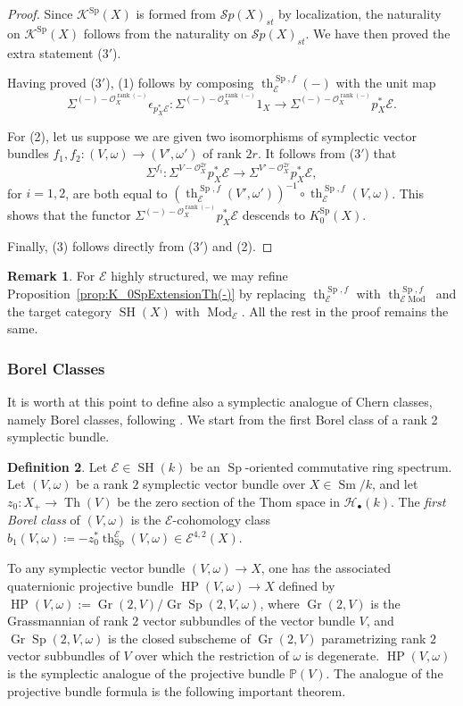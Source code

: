 \documentclass[10pt]{amsart}
\theoremstyle{definition}
\newtheorem{defn}{Definition}[section]
\newtheorem{rmk}[defn]{Remark}
\theoremstyle{plain}
\numberwithin{equation}{section}
\newcommand{\0}{\emptyset}
\newcommand{\sE}{{\mathcal E}}
\newcommand{\sH}{{\mathcal H}}
\newcommand{\sK}{{\mathcal K}}
\newcommand{\sO}{{\mathcal O}}
\newcommand{\sS}{{\mathcal S}}
\renewcommand{\P}{{\mathbb P}}
\newcommand{\Sp}{{\operatorname{Sp}}}
\newcommand{\Gr}{{\operatorname{Gr}}}
\newcommand{\HP}{{\operatorname{HP}}}
\newcommand{\SH}{{\operatorname{SH}}}
\newcommand{\Th}{{\operatorname{Th}}}
\newcommand{\Sm}{{\operatorname{Sm}}}
\renewcommand{\th}{{\operatorname{th}}}
\newcommand{\Mod}{{\operatorname{Mod}}}
\newcommand{\rnk}{{\operatorname{rank}}}
\begin{document}
\begin{proof}
Since $\sK^\Sp(X)$ is formed from $\sS{p}(X)_{st}$ by localization, the naturality on 
$\sK^\Sp(X)$ follows from the naturality on $\sS{p}(X)_{st}$. We have then proved the extra statement ($3'$).

Having proved (3${}'$), (1) follows by composing $\th^{\Sp,f}_{\sE}(-)$ with the unit map 
\[
\Sigma^{(-)-\sO_X^{\rnk(-)}}\epsilon_{p_X^*\sE}:\Sigma^{(-)-\sO_X^{\rnk(-)}}1_X\to \Sigma^{(-)-\sO_X^{\rnk(-)}}p^*_X\sE. 
\]

For (2), let us suppose we are given two isomorphisms of symplectic vector bundles $f_1, f_2:(V,\omega)\to (V', \omega')$ of rank $2r$. It follows from (3${}'$) that
$$\Sigma^{f_i}:\Sigma^{V-\sO_X^{2r}}p_X^*\sE\to \Sigma^{V'-\sO_X^{2r}}p_X^*\sE,$$
for $i=1,2$, are both equal to $(\th^{\Sp,f}_{\sE}(V',\omega'))^{-1}\circ \th^{\Sp,f}_{\sE}(V,\omega)$. This shows that the functor  $\Sigma^{(-)-\sO_X^{\rnk(-)}}p^*_X\sE$ descends to $K_0^\Sp(X)$. 

Finally, (3) follows directly from (3${}'$) and (2).
 \end{proof}

\begin{rmk} For $\sE$ highly structured, we may refine Proposition~\ref{prop:K_0SpExtensionTh(-)} by replacing $\th^{\Sp,f}_{\sE}$ with $\th^{\Sp, f}_{\sE\Mod}$ and the target category $\SH(X)$ with $\Mod_\sE$. All the rest in the proof remains the same.
\end{rmk}
 
\subsubsection{Borel Classes}

It is worth at this point to define also a symplectic analogue of Chern classes, namely Borel classes, following \cite{panwal:grass}. We start from the first Borel class of a rank 2 symplectic bundle.

\begin{defn}
\label{defn:FirstBorelClass}
    Let $\sE \in \SH(k)$ be an $\Sp$-oriented commutative ring spectrum. Let $(V,\omega)$ be a rank $2$ symplectic vector bundle over $X \in \Sm/k$, and let $z_0: X_+ \to \Th(V)$ be the zero section of the Thom space in $\sH_\bullet(k)$. The \emph{first Borel class} of $(V,\omega)$ is the $\sE$-cohomology class $b_1(V,\omega) \coloneqq -z_0^* \th_\Sp^\sE(V,\omega) \in \sE^{4,2}(X)$.
\end{defn}

To any symplectic vector bundle $(V,\omega) \to X$, one has the associated quaternionic projective bundle $\HP(V,\omega) \to X$ defined by $\HP(V,\omega):=\Gr(2,V)/\Gr\Sp(2,V,\omega)$, where $\Gr(2,V)$ is the Grassmannian of rank $2$ vector subbundles of the vector bundle $V$, and $\Gr\Sp(2,V,\omega)$ is the closed subscheme of $\Gr(2,V)$ parametrizing rank $2$ vector subbundles of $V$ over which the restriction of $\omega$ is degenerate. $\HP(V,\omega)$ is the symplectic analogue of the projective bundle $\P(V)$. The analogue of the projective bundle formula is the following important theorem.
\end{document}
